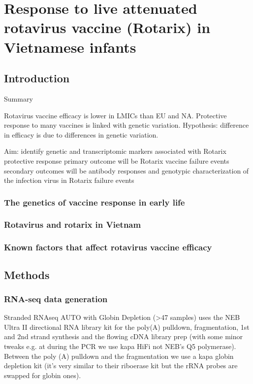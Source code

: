 %
%

\chapter{Response to live attenuated rotavirus vaccine (Rotarix) in Vietnamese infants}

\section{Introduction}

Summary 

Rotavirus vaccine efficacy is lower in LMICs than EU and NA.
Protective response to many vaccines is linked with genetic variation.
Hypothesis: difference in efficacy is due to differences in genetic variation.

Aim:
    identify genetic and transcriptomic markers associated with Rotarix protective response
    primary outcome will be Rotarix vaccine failure events 
    secondary outcomes will be antibody responses and genotypic characterization of the infection virus in Rotarix failure events

\subsection{The genetics of vaccine response in early life}

\subsection{Rotavirus and rotarix in Vietnam}

\subsection{Known factors that affect rotavirus vaccine efficacy}

\section{Methods}

\subsection{RNA-seq data generation}

Stranded RNAseq AUTO with Globin Depletion (>47 samples) uses the NEB Ultra
II directional RNA library kit for the poly(A) pulldown, fragmentation, 1st and
2nd strand synthesis and the flowing cDNA library prep (with some minor tweaks
e.g. at during the PCR we use kapa HiFi not NEB's Q5 polymerase). Between the
poly (A) pulldown and the fragmentation we use a kapa globin depletion kit
(it's very similar to their riboerase kit but the rRNA probes are swapped for
globin ones).

